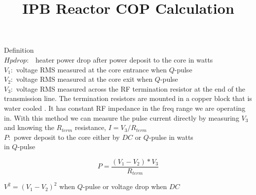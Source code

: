 \documentclass{article}
\title{IPB Reactor COP Calculation}
\begin{document}
\maketitle

Definition\\

$Hpdrop:$ \ heater power drop after power deposit to the core in watts\\

$V_{1}:$ voltage RMS measured at the core entrance when $Q$-pulse\\

$V_{2}:$ voltage RMS measured at the core exit when $Q$-pulse\\

$V_{3}:$ voltage RMS measured across the RF termination resistor at the end of the transmission line. The termination resistors are mounted in a copper block that is water cooled . It has constant RF impedance in the freq range we are operating in. With this method we can measure the pulse current directly by measuring $V_{3}$ and knowing the $R_{term}$ resistance, $I = V_{3} / R_{term}$ \\

$P:$ power deposit to the core either by $DC$ or $Q$-pulse in watts\\
in $Q$-pulse 

\begin{equation}
P=\frac{(V_{1}-V_{2})*V_{3}}{R_{term}} \label{1}%
\end{equation}
%

$V^{2}=(V_{1}-V_{2})^{2}$ when $Q$-pulse or voltage drop when $DC$ \\
\end{document}
